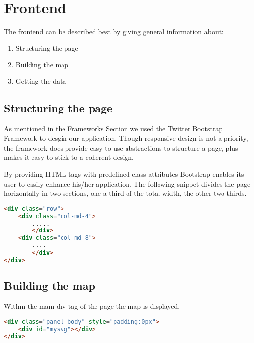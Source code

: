 
\section{Frontend}

The frontend can be described best by giving general information about:

\begin{enumerate}
\def\labelenumi{\arabic{enumi}.}
\itemsep1pt\parskip0pt
\item
  Structuring the page
\item
  Building the map
\item
  Getting the data
\end{enumerate}

\subsection{Structuring the page}\label{structuring-the-page}

As mentioned in the Frameworks Section
we used the Twitter Bootstrap Framework to desgin our application.
Though responsive design is not a priority, the framework does provide
easy to use abstractions to structure a page, plus makes it easy to
stick to a coherent design.

By providing HTML tags with predefined class attributes Bootstrap
enables its user to easily enhance his/her application. The following
snippet divides the page horizontally in two sections, one a third of
the total width, the other two thirds.


\begin{lstlisting}[language=HTML]
<div class="row">
	<div class="col-md-4">
        .....
        </div>
	<div class="col-md-8">
        ....
        </div>
</div>
\end{lstlisting}



\subsection{Building the map}\label{building-the-map}

Within the main div tag of the page the map is displayed.



\begin{lstlisting}[language=HTML]
<div class="panel-body" style="padding:0px">
    <div id="mysvg"></div>
</div>
\end{lstlisting}


